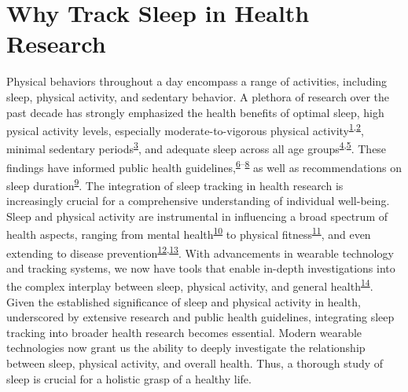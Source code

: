 \documentclass[
  10pt,
]{scrbook}
\begin{document}
\hypertarget{why-track-sleep-in-health-research}{%
\section{Why Track Sleep in Health
Research}\label{why-track-sleep-in-health-research}}

Physical behaviors throughout a day encompass a range of activities,
including sleep, physical activity, and sedentary behavior. A plethora
of research over the past decade has strongly emphasized the health
benefits of optimal sleep, high pysical activity levels, especially
moderate-to-vigorous physical
activity\textsuperscript{\protect\hyperlink{ref-kraus_physical_2019}{1},\protect\hyperlink{ref-lee_effect_2012}{2}},
minimal sedentary
periods\textsuperscript{\protect\hyperlink{ref-wilmot_sedentary_2012}{3}},
and adequate sleep across all age
groups\textsuperscript{\protect\hyperlink{ref-cappuccio_sleep_2010}{4},\protect\hyperlink{ref-jennum_suxf8vn_sundhed_2015}{5}}.
These findings have informed public health
guidelines,\textsuperscript{\protect\hyperlink{ref-kl_physical_2018}{6}--\protect\hyperlink{ref-el-zine_fysisk_nodate}{8}}
as well as recommendations on sleep
duration\textsuperscript{\protect\hyperlink{ref-hirshkowitz_2015}{9}}.
The integration of sleep tracking in health research is increasingly
crucial for a comprehensive understanding of individual well-being.
Sleep and physical activity are instrumental in influencing a broad
spectrum of health aspects, ranging from mental
health\textsuperscript{\protect\hyperlink{ref-biddle_physical_2011}{10}}
to physical
fitness\textsuperscript{\protect\hyperlink{ref-warburton_health_2017}{11}},
and even extending to disease
prevention\textsuperscript{\protect\hyperlink{ref-strath_guide_2013}{12},\protect\hyperlink{ref-arem_leisure_2015}{13}}.
With advancements in wearable technology and tracking systems, we now
have tools that enable in-depth investigations into the complex
interplay between sleep, physical activity, and general
health\textsuperscript{\protect\hyperlink{ref-rollo_whole_2020}{14}}.
Given the established significance of sleep and physical activity in
health, underscored by extensive research and public health guidelines,
integrating sleep tracking into broader health research becomes
essential. Modern wearable technologies now grant us the ability to
deeply investigate the relationship between sleep, physical activity,
and overall health. Thus, a thorough study of sleep is crucial for a
holistic grasp of a healthy life.
\end{document}
